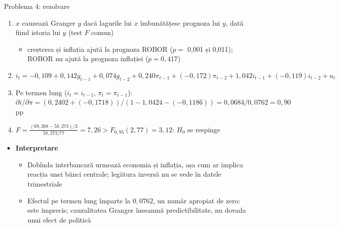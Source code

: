 \begin{frame}{Problema 4: rezolvare}
\itemsize{\footnotesize}
\begin{enumerate}
    \item $x$ cauzează Granger $y$ dacă lagurile lui $x$ îmbunătățesc prognoza lui $y$, dată fiind istoria lui $y$ (test $F$ comun) 
\begin{itemize}
\item creșterea și inflația ajută la prognoza ROBOR ($p =$ 0{,}001 și 0{,}011); ROBOR nu ajută la prognoza inflației ($p = 0{,}417$)
\end{itemize}
    \item $i_t = \ensuremath{-}0{,}109 + 0{,}142g_{t-1} + 0{,}074g_{t-2} + 0{,}240\pi_{t-1} + (\ensuremath{-}0{,}172)\pi_{t-2} + 1{,}042i_{t-1} + (\ensuremath{-}0{,}119)i_{t-2} + u_t$
    \item Pe termen lung ($i_t = i_{t-1}$, $\pi_t = \pi_{t-1}$): $\partial i/\partial\pi = (0{,}2402 + (\ensuremath{-}0{,}1718))/(1 - 1{,}0424 - (\ensuremath{-}0{,}1186)) = 0{,}0684/0{,}0762 = 0{,}90$ pp
    \item $F = \frac{(69{,}268 - 58{,}273)/2}{58{,}273/77} = 7{,}26 > F_{0,95}(2, 77) = 3{,}12$: $H_0$ se respinge
\end{enumerate}
\begin{itemize}
    \item \textbf{Interpretare}
    \begin{itemize}
        \item Dobînda interbancară urmează economia și inflația, așa cum ar implica reacția unei bănci centrale; legătura inversă nu se vede în datele trimestriale
        \item Efectul pe termen lung împarte la $0{,}0762$, un număr apropiat de zero: este imprecis; cauzalitatea Granger înseamnă predictibilitate, nu dovada unui efect de politică
    \end{itemize}
\end{itemize}
\end{frame}

